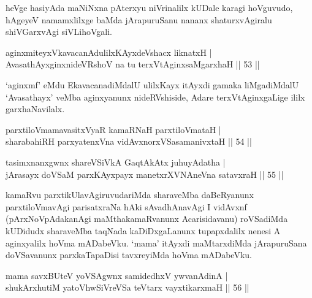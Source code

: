 \begin{artha}
heVge hasiyAda maNiNxna pAterxyu niVrinalilx kUDale karagi hoVguvudo, hAgeyeV namamxlilxge baMda jArapuruSanu nananx shaturxvAgiralu shiVGarxvAgi siVLihoVgali.
\end{artha}


\begin{shl}
aginxmiteyxVkavacanAdulilxKAyxdeVshacx liknatxH | \\
AvasathAyxginxnideVRshoV na tu terxVtAginxsaMgarxhaH \hfill|| 53 || 
\end{shl}

\begin{artha}
`aginxmf' eMdu EkavacanadiMdalU ulilxKayx itAyxdi gamaka liMgadiMdalU `Avasathayx' veMba aginxyanunx nideRVshiside, Adare terxVtAginxgaLige ililx garxhaNavilalx.
\end{artha}


\begin{shl}
parxtiloVmamavasitxVyaR kamaRNaH parxtiloVmataH | \\
sharabahiRH parxyatenxVna vidAvxnorxVSasamanivxtaH \hfill|| 54 || 
\end{shl}

\begin{shl}
tasimxnanxgwnx shareVSiVkA GaqtAkAtx juhuyAdatha | \\
jArasayx doVSaM parxKAyxpayx manetxrXVNAneVna satavxraH \hfill|| 55 || 
\end{shl}

\begin{artha}
kamaRvu parxtikUlavAgiruvudariMda sharaveMba daBeRyanunx parxtiloVmavAgi parisatxraNa hAki sAvadhAnavAgi I vidAvxnf (pArxNoVpAdakanAgi maMthakamaR\-vanunx Acarisidavanu) roVSadiMda kUDidudx sharaveMba taqNada kaDiDxgaLanunx tupapxdalilx nenesi A aginxyalilx hoVma mADabeVku. `mama' itAyxdi maMtarxdiMda jArapuruSana doVSavanunx parxkaTapaDisi tavxreyiMda hoVma mADabeVku.
\end{artha}


\begin{shl}
mama savxBUteV yoVSAgwnx samidedhxV ywvanAdinA | \\
shukArxhutiM yatoV\s hwSiVreVSa teV\s tarx vayxtikarxmaH \hfill|| 56 || 
\end{shl}

